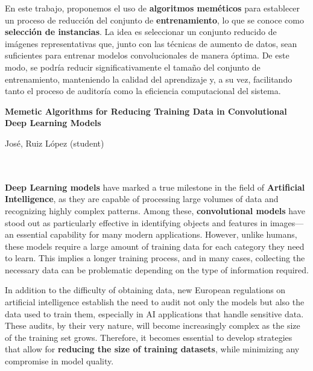 En este trabajo, proponemos el uso de \textbf{algoritmos meméticos} para establecer un proceso de reducción del conjunto de
\textbf{entrenamiento}, lo que se conoce como \textbf{selección de instancias}.
La idea es seleccionar un conjunto reducido de imágenes representativas que, junto con las técnicas de aumento de
datos, sean suficientes para entrenar modelos convolucionales de manera óptima.
De este modo, se podría reducir significativamente el tamaño del conjunto de entrenamiento, manteniendo la calidad
del aprendizaje y, a su vez, facilitando tanto el proceso de auditoría como la eficiencia computacional del sistema.


\cleardoublepage


\thispagestyle{empty}


\begin{center}
       {\large\bfseries Memetic Algorithms for Reducing Training Data in Convolutional Deep Learning Models}\\
\end{center}
\begin{center}
       José, Ruiz López (student)\\
\end{center}

\\

\vspace{0.7cm}
\\

\textbf{Deep Learning models} have marked a true milestone in the field of \textbf{Artificial Intelligence}, as they are capable of 
processing large volumes of data and recognizing highly complex patterns.
Among these, \textbf{convolutional models} have stood out as particularly effective in identifying objects and
features in images—an essential capability for many modern applications.
However, unlike humans, these models require a large amount of training data for each category they need to learn.
This implies a longer training process, and in many cases, collecting the necessary data can be problematic depending
on the type of information required.

In addition to the difficulty of obtaining data, new European regulations on artificial intelligence establish the need to 
audit not only the models but also the data used to train them, especially in AI applications that handle sensitive data.
These audits, by their very nature, will become increasingly complex as the size of the training set grows.
Therefore, it becomes essential to develop strategies that allow for \textbf{reducing the size of training datasets}, 
while minimizing any compromise in model quality.


